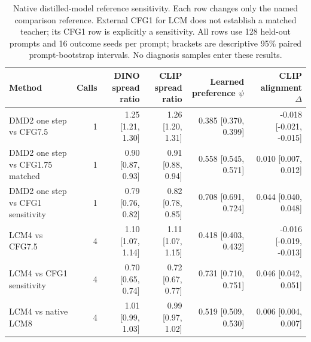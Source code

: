 \begin{table}[t]
\centering\footnotesize
\setlength{\tabcolsep}{3.5pt}
\begin{tabular}{lrrrrr}
\toprule
Method & Calls & \shortstack{DINO spread\\ratio} & \shortstack{CLIP spread\\ratio} & \shortstack{Learned preference\\$\psi$} & \shortstack{CLIP alignment\\$\Delta$} \\
\midrule
DMD2 one step vs CFG7.5 & 1 & 1.25 [1.21, 1.30] & 1.26 [1.20, 1.31] & 0.385 [0.370, 0.399] & -0.018 [-0.021, -0.015] \\
DMD2 one step vs CFG1.75 matched & 1 & 0.90 [0.87, 0.93] & 0.91 [0.88, 0.94] & 0.558 [0.545, 0.571] & 0.010 [0.007, 0.012] \\
DMD2 one step vs CFG1 sensitivity & 1 & 0.79 [0.76, 0.82] & 0.82 [0.78, 0.85] & 0.708 [0.691, 0.724] & 0.044 [0.040, 0.048] \\
LCM4 vs CFG7.5 & 4 & 1.10 [1.07, 1.14] & 1.11 [1.07, 1.15] & 0.418 [0.403, 0.432] & -0.016 [-0.019, -0.013] \\
LCM4 vs CFG1 sensitivity & 4 & 0.70 [0.65, 0.74] & 0.72 [0.67, 0.77] & 0.731 [0.710, 0.751] & 0.046 [0.042, 0.051] \\
LCM4 vs native LCM8 & 4 & 1.01 [0.99, 1.03] & 0.99 [0.97, 1.02] & 0.519 [0.509, 0.530] & 0.006 [0.004, 0.007] \\
\bottomrule
\end{tabular}
\caption{Native distilled-model reference sensitivity. Each row changes only the named comparison reference. External CFG1 for LCM does not establish a matched teacher; its CFG1 row is explicitly a sensitivity. All rows use 128 held-out prompts and 16 outcome seeds per prompt; brackets are descriptive 95\% paired prompt-bootstrap intervals. No diagnosis samples enter these results.}
\label{tab:t2i_native_references}
\end{table}

